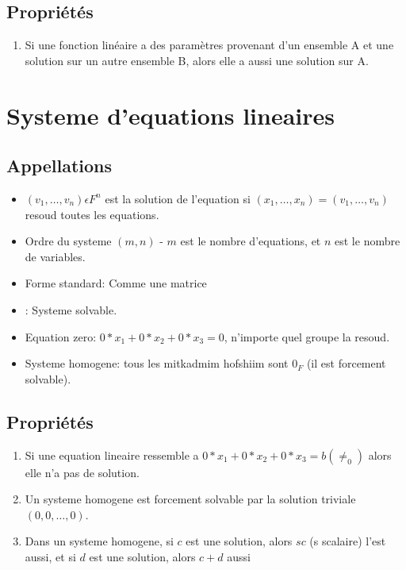 \documentclass[12pt]{article}
\begin{document}
\subsection{Propriétés}
\begin{enumerate}
  \item Si une fonction linéaire a des paramètres provenant d'un ensemble A et une solution sur un autre ensemble B, alors elle a aussi une solution sur A.
\end{enumerate}

\section{Systeme d'equations lineaires}

\subsection{Appellations}
\begin{itemize}
  \item $(v_1, \ldots, v_n) \epsilon  F^n$ est la solution de l'equation si $(x_1, \ldots, x_n) = (v_1, \ldots, v_n)$ resoud toutes les equations.
  \item  Ordre du systeme $(m, n)$ - $m$ est le nombre d'equations, et $n$ est le nombre de variables.  
    \item Forme standard: Comme une matrice
  \item {}: Systeme solvable.  
    \item  Equation zero: $0*x_1 + 0*x_2 + 0*x_3 = 0$, n'importe quel groupe la resoud.
    \item Systeme homogene: tous les mitkadmim hofshiim sont $0_F$ (il est forcement solvable).
\end{itemize}

\subsection{Propriétés}
\begin{enumerate}
  \item Si une equation lineaire ressemble a $0*x_1 + 0*x_2 + 0*x_3 = b(\neq_0)$ alors elle n'a pas de solution.
  \item  Un systeme homogene est forcement solvable par la solution triviale $(0, 0,\ldots, 0)$.
  \item Dans un systeme homogene, si $c$ est une solution, alors  $sc$ (s scalaire) l'est aussi, et si  $d$ est une solution, alors $c + d$ aussi
\end{enumerate}
\end{document}
